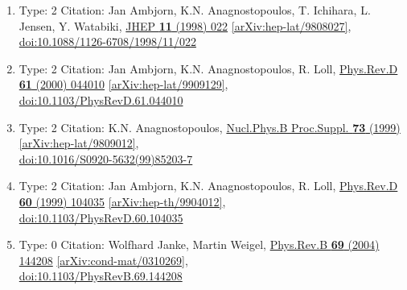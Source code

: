 \documentclass[a4paper,10pt]{article}
\begin{document}
\begin{enumerate}
\begin{enumerate}
  \item Type: 2 Citation: Jan Ambjorn, K.N. Anagnostopoulos, T. Ichihara, L. Jensen, Y. Watabiki, \href{https://www.doi.org/10.1088/1126-6708/1998/11/022}{JHEP {\bf 11} (1998) 022}  \href{https://arxiv.org/abs/hep-lat/9808027}{[arXiv:hep-lat/9808027]},\\\href{https://www.doi.org/10.1088/1126-6708/1998/11/022}{doi:10.1088/1126-6708/1998/11/022}
  \item Type: 2 Citation: Jan Ambjorn, K.N. Anagnostopoulos, R. Loll, \href{https://www.doi.org/10.1103/PhysRevD.61.044010}{Phys.Rev.D {\bf 61} (2000) 044010}  \href{https://arxiv.org/abs/hep-lat/9909129}{[arXiv:hep-lat/9909129]},\\\href{https://www.doi.org/10.1103/PhysRevD.61.044010}{doi:10.1103/PhysRevD.61.044010}
  \item Type: 2 Citation: K.N. Anagnostopoulos, \href{https://www.doi.org/10.1016/S0920-5632(99)85203-7}{Nucl.Phys.B Proc.Suppl. {\bf 73} (1999) }  \href{https://arxiv.org/abs/hep-lat/9809012}{[arXiv:hep-lat/9809012]},\\\href{https://www.doi.org/10.1016/S0920-5632(99)85203-7}{doi:10.1016/S0920-5632(99)85203-7}
  \item Type: 2 Citation: Jan Ambjorn, K.N. Anagnostopoulos, R. Loll, \href{https://www.doi.org/10.1103/PhysRevD.60.104035}{Phys.Rev.D {\bf 60} (1999) 104035}  \href{https://arxiv.org/abs/hep-th/9904012}{[arXiv:hep-th/9904012]},\\\href{https://www.doi.org/10.1103/PhysRevD.60.104035}{doi:10.1103/PhysRevD.60.104035}
  \item Type: 0 Citation: Wolfhard Janke, Martin Weigel, \href{https://www.doi.org/10.1103/PhysRevB.69.144208}{Phys.Rev.B {\bf 69} (2004) 144208}  \href{https://arxiv.org/abs/cond-mat/0310269}{[arXiv:cond-mat/0310269]},\\\href{https://www.doi.org/10.1103/PhysRevB.69.144208}{doi:10.1103/PhysRevB.69.144208}

\end{enumerate}
\end{enumerate}
\end{document}
